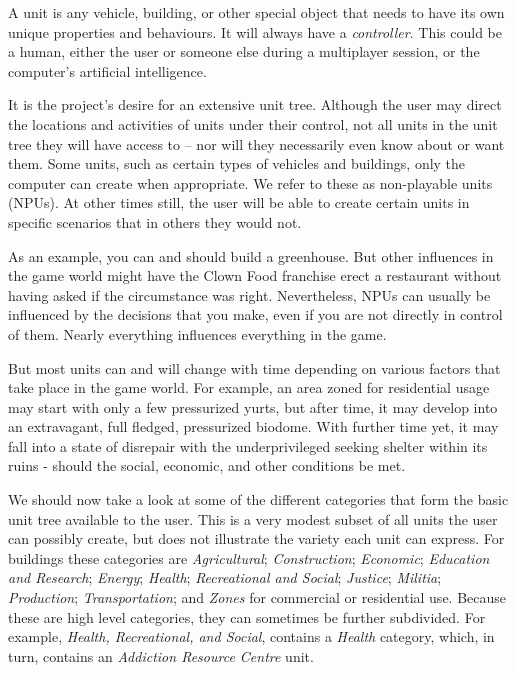 

A unit is any vehicle, building, or other special object that needs to have its own unique properties and behaviours. It will always have a {\it controller}. This could be a human, either the user or someone else during a multiplayer session, or the computer's artificial intelligence.

It is the project's desire for an extensive unit tree. Although the user may direct the locations and activities of units under their control, not all units in the unit tree they will have access to -- nor will they necessarily even know about or want them. Some units, such as certain types of vehicles and buildings, only the computer can create when appropriate. We refer to these as non-playable units (NPUs). At other times still, the user will be able to create certain units in specific scenarios that in others they would not.

As an example, you can and should build a greenhouse. But other influences in the game world might have the Clown Food franchise erect a restaurant without having asked if the circumstance was right. Nevertheless, NPUs can usually be influenced by the decisions that you make, even if you are not directly in control of them. Nearly everything influences everything in the game.

But most units can and will change with time depending on various factors that take place in the game world. For example, an area zoned for residential usage may start with only a few pressurized yurts, but after time, it may develop into an extravagant, full fledged, pressurized biodome. With further time yet, it may fall into a state of disrepair with the underprivileged seeking shelter within its ruins - should the social, economic, and other conditions be met.

We should now take a look at some of the different categories that form the basic unit tree available to the user. This is a very modest subset of all units the user can possibly create, but does not illustrate the variety each unit can express. For buildings these categories are {\it Agricultural}; {\it Construction}; {\it Economic}; {\it Education and Research}; {\it Energy}; {\it Health}; {\it Recreational and Social}; {\it Justice}; {\it Militia}; {\it Production}; {\it Transportation}; and {\it Zones} for commercial or residential use. Because these are high level categories, they can sometimes be further subdivided. For example, {\it Health, Recreational, and Social}, contains a {\it Health} category, which, in turn, contains an {\it Addiction Resource Centre} unit.


